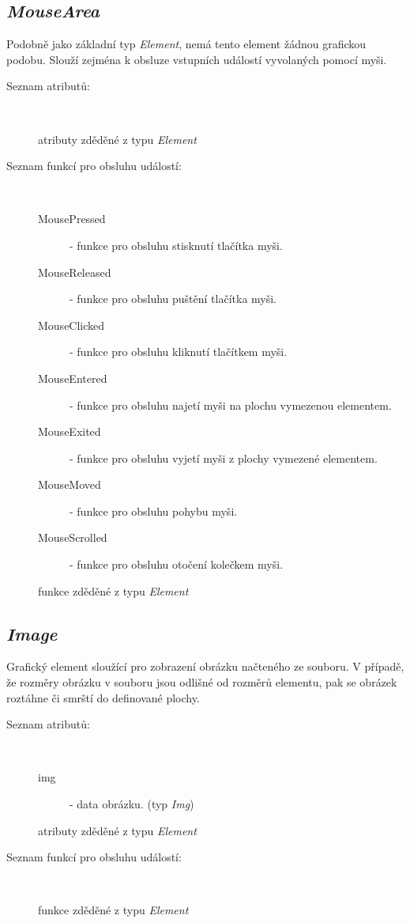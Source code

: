 \documentclass[11pt,twoside,a4paper]{book}
\begin{document}
\subsection{\textit{MouseArea}}
Podobně jako základní typ \textit{Element}, nemá tento element žádnou grafickou podobu. Slouží zejména k obsluze vstupních událostí vyvolaných pomocí myši.\\
\begin{description}
\item[Seznam atributů:] ~
\begin{description}
\item[atributy zděděné z typu \textit{Element}]
\end{description}
\item[Seznam funkcí pro obsluhu událostí:] ~
\begin{description}
\item[MousePressed] - funkce pro obsluhu stisknutí tlačítka myši.
\item[MouseReleased] - funkce pro obsluhu puštění tlačítka myši.
\item[MouseClicked] - funkce pro obsluhu kliknutí tlačítkem myši.
\item[MouseEntered] - funkce pro obsluhu najetí myši na plochu vymezenou elementem.
\item[MouseExited] - funkce pro obsluhu vyjetí myši z plochy vymezené elementem.
\item[MouseMoved] - funkce pro obsluhu pohybu myši.
\item[MouseScrolled] - funkce pro obsluhu otočení kolečkem myši.
\item[funkce zděděné z typu \textit{Element}]
\end{description}
\end{description}

\subsection{\textit{Image}}
Grafický element sloužící pro zobrazení obrázku načteného ze souboru. V případě, že rozměry obrázku v souboru jsou odlišné od rozměrů elementu, pak se obrázek roztáhne či smrští do definované plochy.\\
\begin{description}
\item[Seznam atributů:] ~
\begin{description}
\item[img] - data obrázku. (typ \textit{Img})
\item[atributy zděděné z typu \textit{Element}]
\end{description}
\item[Seznam funkcí pro obsluhu událostí:] ~
\begin{description}
\item[funkce zděděné z typu \textit{Element}]
\end{description}
\end{description}
\end{document}
